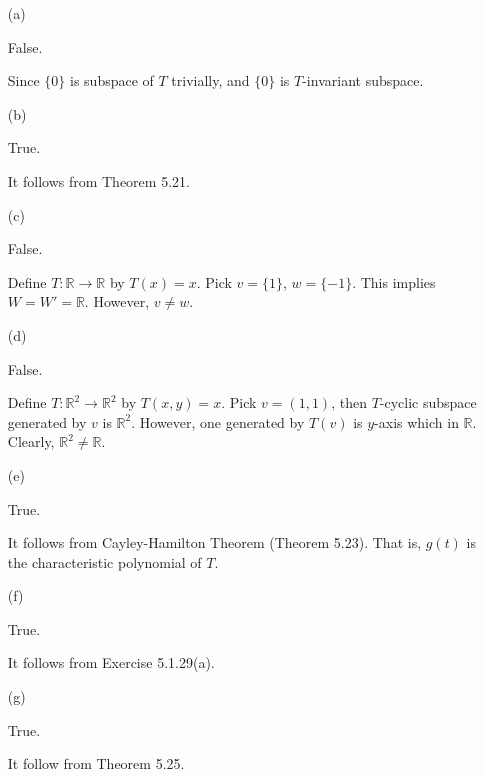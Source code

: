 \begin{Exercise}
\begin{enumerate}[(a)]
\item[(a)]
\begin{answer}
False.
\end{answer}
\begin{solution}
Since $\{0\}$ is subspace of $T$ trivially, and $\{0\}$ is $T$-invariant subspace.
\end{solution}

\item[(b)]
\begin{answer}
True.
\end{answer}
\begin{solution}
It follows from Theorem 5.21.
\end{solution}

\item[(c)]
\begin{answer}
False.
\end{answer}
\begin{solution}
Define $T:\mathbb{R}\to\mathbb{R}$ by $T(x) = x$. Pick $v=\{1\}$, $w=\{-1\}$. This implies $W=W'=\mathbb{R}$. However, $v\neq w$.
\end{solution}

\item[(d)]
\begin{answer}
False.
\end{answer}
\begin{solution}
Define $T:\mathbb{R}^2\to\mathbb{R}^2$ by $T(x,y) = x$. Pick $v = (1,1)$, then $T$-cyclic subspace generated by $v$ is $\mathbb{R}^2$. However, one generated by $T(v)$ is $y$-axis which in $\mathbb{R}$. Clearly, $\mathbb{R}^2 \neq \mathbb{R}$.
\end{solution}

\item[(e)]
\begin{answer}
True.
\end{answer}
\begin{solution}
It follows from Cayley-Hamilton Theorem (Theorem 5.23). That is, $g(t)$ is the characteristic polynomial of $T$.
\end{solution}

\item[(f)]
\begin{answer}
True.
\end{answer}
\begin{solution}
It follows from Exercise 5.1.29(a).
\end{solution}

\item[(g)]
\begin{answer}
True.
\end{answer}
\begin{solution}
It follow from Theorem 5.25.
\end{solution}

\end{enumerate}
\end{Exercise}